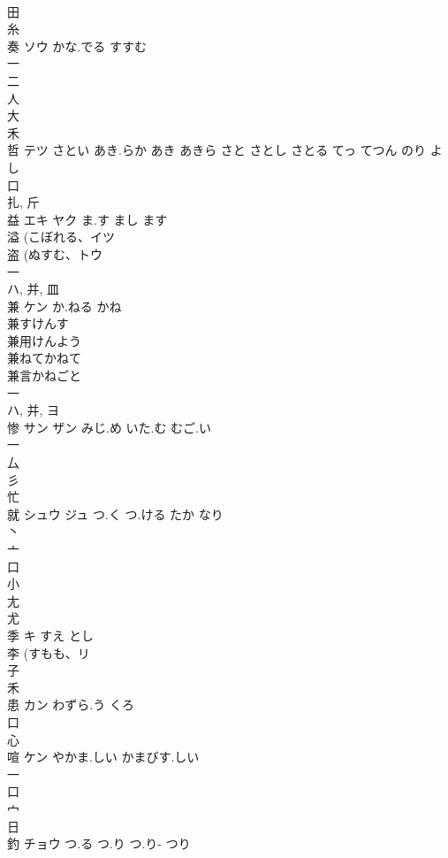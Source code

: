 \documentclass[8pt]{extreport}
\begin{document}
\begin{CJK}{UTF8}{min}
\\	田 
\\	糸 
\\	奏	ソウ	かな.でる すすむ	
\\	一 
\\	二 
\\	人 
\\	大 
\\	禾 
\\	哲	テツ	さとい あき.らか あき あきら さと さとし さとる てっ てつん のり よし	
\\	口 
\\	扎, 斤 
\\	益	エキ ヤク	ま.す まし ます	
\\	溢 (こぼれる、イツ 
\\	盗 (ぬすむ、トウ 
\\	一 
\\	ハ, 并, 皿 
\\	兼	ケン	か.ねる かね	
\\	兼すけんす
\\	兼用けんよう
\\	兼ねてかねて
\\	兼言かねごと
\\	一 
\\	ハ, 并, ヨ	
\\	惨	サン ザン	みじ.め いた.む むご.い	
\\	一 
\\	厶 
\\	彡 
\\	忙 
\\	就	シュウ ジュ	つ.く つ.ける たか なり	
\\	丶 
\\	亠 
\\	口 
\\	小 
\\	尢 
\\	尤 
\\	季	キ	すえ とし	
\\	李 (すもも、リ 
\\	子 
\\	禾 
\\	患	カン	わずら.う くろ	
\\	口 
\\	心 
\\	喧	ケン	やかま.しい かまびす.しい	
\\	一 
\\	口 
\\	宀 
\\	日 
\\	釣	チョウ	つ.る つ.り つ.り- つり	

\end{CJK}
\end{document}
